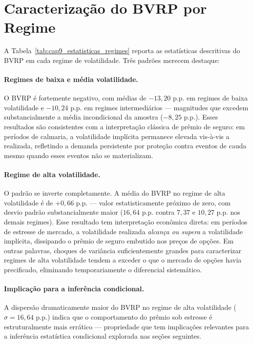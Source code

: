 \section{Caracterização do BVRP por Regime}
\label{sec:cap9_bvrp_regimes}



A Tabela~\ref{tab:cap9_estatisticas_regimes} reporta as estatísticas descritivas do BVRP em cada regime de volatilidade. Três padrões merecem destaque:

\paragraph{Regimes de baixa e média volatilidade.} O BVRP é fortemente negativo, com médias de $-13{,}20$ p.p. em regimes de baixa volatilidade e $-10{,}24$ p.p. em regimes intermediários --- magnitudes que excedem substancialmente a média incondicional da amostra ($-8{,}25$ p.p.). Esses resultados são consistentes com a interpretação clássica de prêmio de seguro: em períodos de calmaria, a volatilidade implícita permanece elevada vis-à-vis a realizada, refletindo a demanda persistente por proteção contra eventos de cauda mesmo quando esses eventos não se materializam.

\paragraph{Regime de alta volatilidade.} O padrão se inverte completamente. A média do BVRP no regime de alta volatilidade é de $+0{,}66$ p.p. --- valor estatisticamente próximo de zero, com desvio padrão substancialmente maior ($16{,}64$ p.p. contra $7{,}37$ e $10{,}27$ p.p. nos demais regimes). Esse resultado tem interpretação econômica direta: em períodos de estresse de mercado, a volatilidade realizada \emph{alcança ou supera} a volatilidade implícita, dissipando o prêmio de seguro embutido nos preços de opções. Em outras palavras, choques de variância suficientemente grandes para caracterizar regimes de alta volatilidade tendem a exceder o que o mercado de opções havia precificado, eliminando temporariamente o diferencial sistemático.

\paragraph{Implicação para a inferência condicional.} A dispersão dramaticamente maior do BVRP no regime de alta volatilidade ($\sigma = 16{,}64$ p.p.) indica que o comportamento do prêmio sob estresse é estruturalmente mais errático --- propriedade que tem implicações relevantes para a inferência estatística condicional explorada nas seções seguintes.

